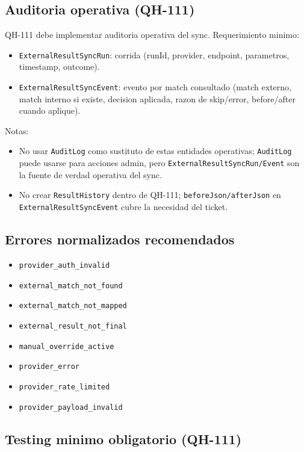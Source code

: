\subsection{Auditoria operativa (QH-111)}

QH-111 debe implementar auditoria operativa del sync. Requerimiento minimo:
\begin{itemize}
  \item \texttt{ExternalResultSyncRun}: corrida (runId, provider, endpoint, parametros, timestamp, outcome).
  \item \texttt{ExternalResultSyncEvent}: evento por match consultado (match externo, match interno si existe, decision aplicada, razon de skip/error, before/after cuando aplique).
\end{itemize}

Notas:
\begin{itemize}
  \item No usar \texttt{AuditLog} como sustituto de estas entidades operativas; \texttt{AuditLog} puede usarse para acciones admin, pero \texttt{ExternalResultSyncRun/Event} son la fuente de verdad operativa del sync.
  \item No crear \texttt{ResultHistory} dentro de QH-111; \texttt{beforeJson/afterJson} en \texttt{ExternalResultSyncEvent} cubre la necesidad del ticket.
\end{itemize}

\subsection{Errores normalizados recomendados}

\begin{itemize}
  \item \texttt{provider\_auth\_invalid}
  \item \texttt{external\_match\_not\_found}
  \item \texttt{external\_match\_not\_mapped}
  \item \texttt{external\_result\_not\_final}
  \item \texttt{manual\_override\_active}
  \item \texttt{provider\_error}
  \item \texttt{provider\_rate\_limited}
  \item \texttt{provider\_payload\_invalid}
\end{itemize}

\subsection{Testing minimo obligatorio (QH-111)}

